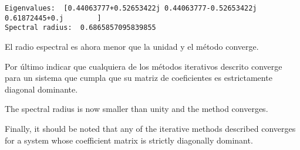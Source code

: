 \begin{verbatim}
Eigenvalues:  [0.44063777+0.52653422j 0.44063777-0.52653422j 0.61872445+0.j        ]
Spectral radius:  0.6865857095839855
\end{verbatim}

\begin{paracol}{2}

El radio espectral es ahora menor que la unidad y el método converge.

Por último indicar que cualquiera de los métodos iterativos descrito converge para un sistema que cumpla que su matriz de coeficientes es estrictamente diagonal dominante.

\switchcolumn
The spectral radius is now smaller than unity and the method converges.

Finally, it should be noted that any of the iterative methods described converges for a system whose coefficient matrix is strictly diagonally dominant.

\end{paracol}
